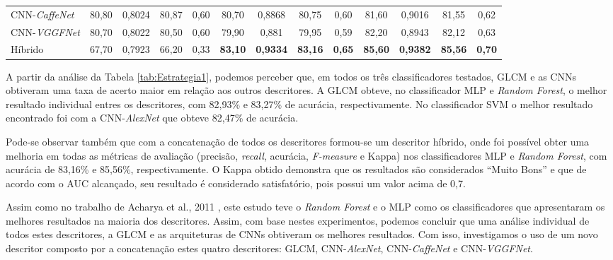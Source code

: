 \documentclass[fleqn,10pt]{SelfArx} %
\begin{document}
\begin{table*}[ht]
{\begin{tabular}{|l|cccc|cccc|cccc|}
			CNN-\textit{CaffeNet} & 80,80 & 0,8024 & 80,87 & 0,60 & 80,70 & 0,8868 & 80,75 & 0,60 & 81,60 & 0,9016 & 81,55 &  0,62\\
			
			CNN-\textit{VGGFNet} & 80,70 & 0,8022 & 80,50 & 0,60 & 79,90 & 0,881 & 79,95 &  0,59 & 82,20 & 0,8943 & 82,12 & 0,63\\
			
			Híbrido & 67,70 & 0,7923 & 66,20 &  0,33& \textbf{83,10} & \textbf{0,9334}& \textbf{83,16}& \textbf{0,65} & \textbf{85,60} & \textbf{0,9382} & \textbf{85,56} &  \textbf{0,70}\\
			\hline
		\end{tabular}%
	}
\end{table*}



A partir da análise da Tabela \ref{tab:Estrategia1}, podemos perceber que, em todos os três classificadores testados, GLCM e as CNNs obtiveram uma taxa de acerto maior em relação aos outros descritores. A GLCM obteve, no classificador MLP e \textit{Random Forest}, o melhor resultado individual entres os descritores, com 82,93\% e 83,27\% de acurácia, respectivamente. No classificador SVM o melhor resultado encontrado foi com a CNN-\textit{AlexNet} que obteve 82,47\% de acurácia. 

Pode-se observar também que com a concatenação de todos
os descritores formou-se um descritor híbrido, onde foi possível obter uma melhoria em todas as métricas de avaliação (precisão, \textit{recall}, acurácia, \textit{F-measure} e Kappa) nos classificadores MLP e \textit{Random Forest}, com acurácia de 83,16\% e
85,56\%, respectivamente. O Kappa obtido demonstra
que os resultados são considerados “Muito Bons” e que de acordo com o AUC alcançado, seu resultado é considerado satisfatório, pois possui um valor acima de 0,7.

Assim como no trabalho de Acharya et al., 2011 \cite{acharya2011automated}, este estudo teve o \textit{Random Forest} e o MLP como os classificadores que apresentaram os melhores resultados na maioria dos descritores. Assim, com base nestes experimentos, podemos concluir que uma análise individual de todos estes descritores, a GLCM e as arquiteturas de CNNs obtiveram os melhores resultados. Com isso, investigamos o uso de um novo descritor composto por a concatenação estes quatro descritores: GLCM, CNN-\textit{AlexNet}, CNN-\textit{CaffeNet} e CNN-\textit{VGGFNet}.
\end{document}
